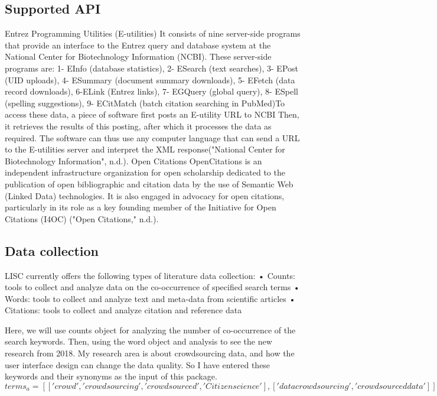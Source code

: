 \documentclass{article}
\begin{document}
\subsection*{Supported API}
Entrez Programming Utilities (E-utilities)
It consists of nine server-side programs that provide an interface to the Entrez query and database system at the National Center for Biotechnology Information (NCBI).  These server-side programs are: 1- EInfo (database statistics), 2- ESearch (text searches), 3- EPost (UID uploads), 4- ESummary (document summary downloads), 5- EFetch (data record downloads), 6-ELink (Entrez links), 7- EGQuery (global query), 8- ESpell (spelling suggestions), 9- ECitMatch (batch citation searching in PubMed)To access these data, a piece of software first posts an E-utility URL to NCBI Then, it retrieves the results of this posting, after which it processes the data as required. The software can thus use any computer language that can send a URL to the E-utilities server and interpret the XML response("National Center for Biotechnology Information", n.d.).
Open Citations
OpenCitations is an independent infrastructure organization for open scholarship dedicated to the publication of open bibliographic and citation data by the use of Semantic Web (Linked Data) technologies. It is also engaged in advocacy for open citations, particularly in its role as a key founding member of the Initiative for Open Citations (I4OC) ("Open Citations," n.d.).
\subsection*{Data collection}
LISC currently offers the following types of literature data collection: 
\newline• Counts: tools to collect and analyze data on the co-occurrence of specified search terms 
\newline• Words: tools to collect and analyze text and meta-data from scientific articles 
\newline• Citations: tools to collect and analyze citation and reference data 

Here, we will use counts object for analyzing the number of co-occurrence of the search keywords. Then, using the word object and analysis to see the new research from 2018.
My research area is about crowdsourcing data, and how the user interface design can change the data quality. So I have entered these keywords and their synonyms as the input of this package. 
\begin{equation}
terms_a = [['crowd','crowdsourcing','crowdsourced','Citizen science'],['data crowdsourcing','crowdsourced data']]
\end{equation}
\end{document}
